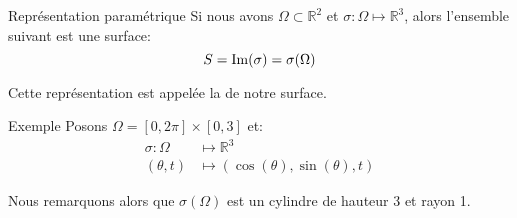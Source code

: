 \documentclass[a4paper]{article}
\begin{document}
\begin{parag}{Représentation paramétrique}
    Si nous avons $\Omega \subset \mathbb{R}^2$ et $\sigma : \Omega \mapsto \mathbb{R}^3$, alors l'ensemble suivant est une surface: 
    \[S = \im\left(\sigma\right) = \sigma\left(\Omega\right)\]
    
    Cette représentation est appelée la  de notre surface.

    \begin{subparag}{Exemple}
        Posons $\Omega = \left[0, 2\pi\right] \times \left[0, 3\right]$ et:
        \[\begin{split}
        \sigma: \Omega &\longmapsto \mathbb{R}^3 \\
        \left(\theta, t\right) &\longmapsto \left(\cos\left(\theta\right), \sin\left(\theta\right), t\right)
        \end{split}\]
        
        Nous remarquons alors que $\sigma\left(\Omega\right)$ est un cylindre de hauteur 3 et rayon 1.
    \end{subparag}
\end{parag}
\end{document}
